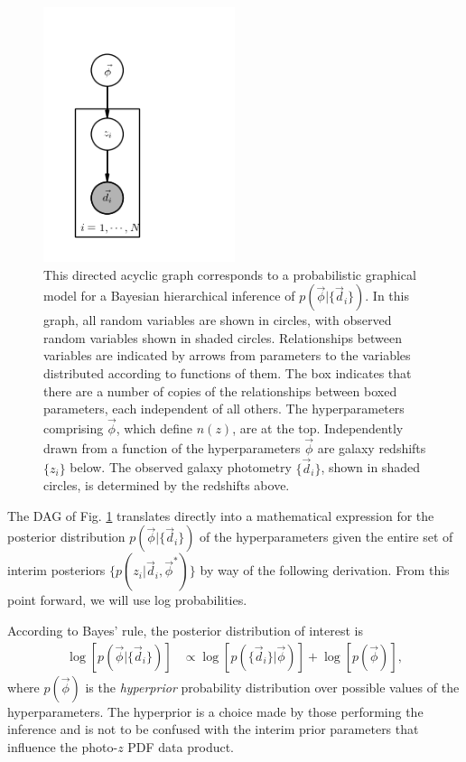 \documentclass[iop]{emulateapj}
\begin{document}
\begin{figure}
	\begin{center}
		\includegraphics[width=0.5\textwidth]{pgm.png}
		\caption{This directed acyclic graph corresponds to a 
probabilistic graphical model for a Bayesian hierarchical inference of 
$p(\vec{\phi}|\{\vec{d}_{i}\})$.  In this graph, all random variables are shown 
in circles, with observed random variables shown in shaded circles.  
Relationships between variables are indicated by arrows from parameters to the 
variables distributed according to functions of them.  The box indicates that 
there are a number of copies of the relationships between boxed parameters, 
each independent of all others.  The hyperparameters comprising $\vec{\phi}$, 
which define $n(z)$, are at the top.  Independently drawn from a function of 
the hyperparameters $\vec{\phi}$ are galaxy redshifts $\{z_{i}\}$ below.  The 
observed galaxy photometry $\{\vec{d}_{i}\}$, shown in shaded circles, is 
determined by the redshifts above.}
	\label{fig:pgm}
	\end{center}
\end{figure}

The DAG of Fig. \ref{fig:pgm} translates directly into a mathematical 
expression for the posterior distribution $p(\vec{\phi} | \{\vec{d}_{i}\})$ of 
the hyperparameters given the entire set of interim posteriors $\{p(z_{i} | 
\vec{d}_{i}, \vec{\phi}^{*})\}$ by way of the following derivation.  From this 
point forward, we will use log probabilities.

According to Bayes' rule, the posterior distribution of interest is
\begin{align}
\label{eq:hyper_bayes}
\log[p(\vec{\phi} | \{\vec{d}_{i}\})] &\propto \log[p(\{\vec{d}_{i}\} | 
\vec{\phi})] + \log[p(\vec{\phi})] ,
\end{align}
where $p(\vec{\phi})$ is the \textit{hyperprior} probability distribution over 
possible values of the hyperparameters.  The hyperprior is a choice made by 
those performing the inference and is not to be confused with the interim prior 
parameters that influence the photo-$z$ PDF data product.
\end{document}
